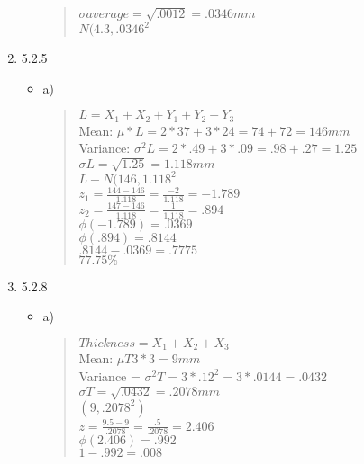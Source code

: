 \documentclass{article}
\begin{document}
\begin{enumerate}
\begin{itemize}
\begin{quote}
                $\sigma average = \sqrt{.0012} = .0346mm$ \\
                $N(4.3,.0346^{2}$
            \end{quote}
        \end{itemize}
    \item 5.2.5 
        \begin{itemize}
            \item a)
            \begin{quote}
                $L = X_{1}+X_{2}+Y_{1}+Y_{2}+Y_{3}$ \\
                Mean: $\mu *L = 2*37+3*24 = 74+72 = 146mm$ \\
                Variance: $\sigma^{2} L = 2*.49+3*.09 = .98+.27 = 1.25$ \\
                $\sigma L = \sqrt{1.25} = 1.118mm$ \\
                $L - N(146, 1.118^{2}$ \\
                $z_{1} = \frac{144-146}{1.118} = \frac{-2}{1.118} = -1.789$ \\
                $z_{2} = \frac{147-146}{1.118} = \frac{1}{1.118} = .894$ \\
                $\phi(-1.789) = .0369$ \\
                $\phi(.894) = .8144$ \\
                $.8144-.0369 = .7775$ \\
                $77.75\%$
            \end{quote}
        \end{itemize}
    \item 5.2.8 
        \begin{itemize}
            \item a)
            \begin{quote}
                $Thickness = X_{1}+X_{2}+X_{3}$ \\
                Mean: $\mu T 3*3 = 9mm$ \\
                Variance = $\sigma^{2} T = 3*.12^{2} = 3*.0144 = .0432$ \\
                $\sigma T = \sqrt{.0432} = .2078 mm$ \\
                $(9, .2078^{2})$ \\
                $z = \frac{9.5-9}{.2078} = \frac{.5}{.2078} = 2.406$ \\
                $\phi(2.406) = .992$ \\
                $1-.992 = .008$ \\

\end{quote}
\end{itemize}
\end{enumerate}
\end{document}
